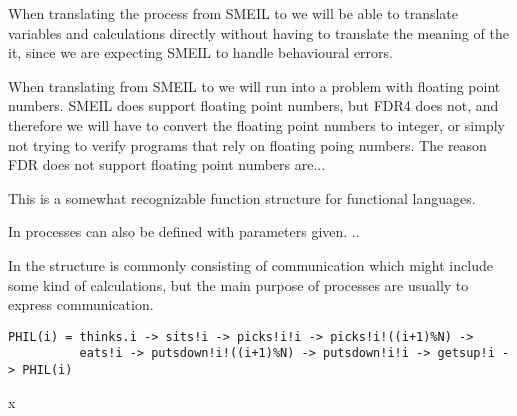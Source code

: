 When translating the process from SMEIL to \cspm we will be able to translate variables and calculations directly without having to translate the meaning of the it, since we are expecting SMEIL to handle behavioural errors.

When translating from SMEIL to \cspm we will run into a problem with floating point numbers. SMEIL does support floating point numbers, but FDR4 does not, %
and therefore we will have to convert the floating point numbers to integer, or simply not trying to verify programs that rely on floating poing numbers. The reason FDR does not support floating point numbers are... %



This is a somewhat recognizable function structure for functional languages.



In \cspm{} processes can also be defined with parameters given. .. %


In \cspm the structure is commonly consisting of communication which might include some kind of calculations, but the main purpose of \cspm processes are usually to express communication. %

\begin{listing}
\begin{verbatim}
PHIL(i) = thinks.i -> sits!i -> picks!i!i -> picks!i!((i+1)%N) ->
          eats!i -> putsdown!i!((i+1)%N) -> putsdown!i!i -> getsup!i -> PHIL(i)

\end{verbatim}
\caption{x}
\label{x}
\end{listing}




